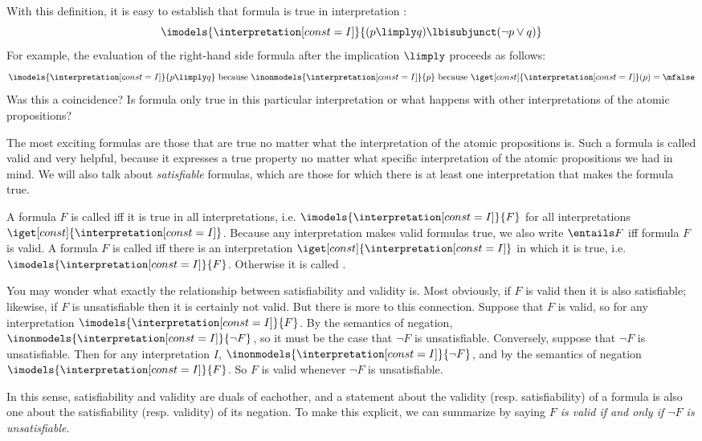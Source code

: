 \documentclass[11pt,twoside]{scrartcl}
\newcommand{\I}{\interpretation[const=I]}
\begin{document}
With this definition, it is easy to establish that formula  is true in interpretation :
\[
\imodels{\I}{(p \limply q) \lbisubjunct (\lnot p \lor q)}
\]
For example, the evaluation of the right-hand side formula after the implication $\limply$ proceeds as follows:
\[
\imodels{\I}{p \limply q}
~\text{because}~ \inonmodels{\I}{p}
~\text{because}~ \iget[const]{\I}(p)=\mfalse
\]
Was this a coincidence?
Is formula  only true in this particular interpretation  or what happens with other interpretations of the atomic propositions?

The most exciting formulas are those that are true no matter what the interpretation of the atomic propositions is.
Such a formula is called valid and very helpful, because it expresses a true property no matter what specific interpretation of the atomic propositions we had in mind. We will also talk about \emph{satisfiable} formulas, which are those for which there is at least one interpretation that makes the formula true.

\begin{definition}
  A formula $F$ is called  iff it is true in all interpretations, i.e. \(\imodels{\I}{F}\) for all interpretations $\iget[const]{\I}$.
  Because any interpretation makes valid formulas true, we also write \(\entails F\) iff formula $F$ is valid.
  A formula $F$ is called  iff there is an interpretation $\iget[const]{\I}$ in which it is true, i.e. \(\imodels{\I}{F}\).
  Otherwise it is called .
\end{definition}

You may wonder what exactly the relationship between satisfiability and validity is. Most obviously, if $F$ is valid then it is also satisfiable; likewise, if $F$ is unsatisfiable then it is certainly not valid. But there is more to this connection. 
Suppose that $F$ is valid, so for any interpretation $\imodels{\I}{F}$. By the semantics of negation, $\inonmodels{\I}{\lnot F}$, so it must be the case that $\lnot F$ is unsatisfiable. Conversely, suppose that $\lnot F$ is unsatisfiable. Then for any interpretation $I$, $\inonmodels{\I}{\lnot F}$, and by the semantics of negation $\imodels{\I}{F}$. So $F$ is valid whenever $\lnot F$ is unsatisfiable. 

In this sense, satisfiability and validity are duals of eachother, and a statement about the validity (resp. satisfiability) of a formula is also one about the satisfiability (resp. validity) of its negation. To make this explicit, we can summarize by saying \emph{$F$ is valid if and only if $\lnot F$ is unsatisfiable}.
\end{document}
